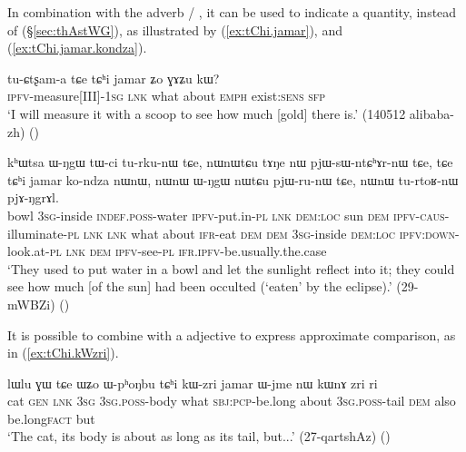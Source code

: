 In combination with the adverb  / , it can be used to indicate a quantity, instead of  (§\ref{sec:thAstWG}), as illustrated by (\ref{ex:tChi.jamar}), and (\ref{ex:tChi.jamar.kondza}).

\begin{exe}
\ex \label{ex:tChi.jamar}
\gll tu-ɕtʂam-a tɕe tɕʰi jamar ʑo ɣɤʑu kɯ? \\
\textsc{ipfv}-measure[III]-\textsc{1sg} \textsc{lnk} what about \textsc{emph} exist:\textsc{sens} \textsc{sfp} \\
\glt `I will measure it with a scoop to see how much [gold] there is.' (140512 alibaba-zh)
()
\end{exe}  

\begin{exe}
\ex \label{ex:tChi.jamar.kondza}
\gll kʰɯtsa ɯ-ŋgɯ tɯ-ci tu-rku-nɯ tɕe, nɯnɯtɕu tɤŋe nɯ pjɯ-sɯ-ntɕʰɤr-nɯ tɕe, tɕe tɕʰi jamar ko-ndza nɯnɯ, nɯnɯ ɯ-ŋgɯ nɯtɕu pjɯ-ru-nɯ tɕe,  nɯnɯ tu-rtoʁ-nɯ pjɤ-ŋgrɤl.   \\
bowl \textsc{3sg}-inside \textsc{indef}.\textsc{poss}-water \textsc{ipfv}-put.in-\textsc{pl} \textsc{lnk} \textsc{dem}:\textsc{loc} sun \textsc{dem} \textsc{ipfv}-\textsc{caus}-illuminate-\textsc{pl} \textsc{lnk} \textsc{lnk} what about \textsc{ifr}-eat \textsc{dem} \textsc{dem} \textsc{3sg}-inside \textsc{dem}:\textsc{loc} \textsc{ipfv}:\textsc{down}-look.at-\textsc{pl} \textsc{lnk} \textsc{dem} \textsc{ipfv}-see-\textsc{pl} \textsc{ifr}.\textsc{ipfv}-be.usually.the.case \\
\glt `They used to put water in a bowl and let the sunlight reflect into it; they could see how much [of the sun] had been occulted (`eaten' by the eclipse).' (29-mWBZi)
()
\end{exe}  

It is possible to combine  with a adjective to express approximate comparison, as in (\ref{ex:tChi.kWzri}).

\begin{exe}
\ex \label{ex:tChi.kWzri}
\gll lɯlu ɣɯ tɕe ɯʑo ɯ-pʰoŋbu tɕʰi kɯ-zri jamar ɯ-jme nɯ kɯnɤ zri ri \\
cat \textsc{gen} \textsc{lnk} \textsc{3sg} \textsc{3sg}.\textsc{poss}-body what \textsc{sbj}:\textsc{pcp}-be.long about \textsc{3sg}.\textsc{poss}-tail \textsc{dem} also be.long\textsc{fact} but \\
\glt `The cat, its body is about as long as its tail, but...' (27-qartshAz)
()
\end{exe}  


